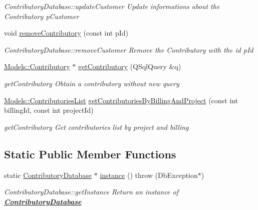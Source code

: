 \begin{DoxyCompactItemize}
\begin{DoxyCompactList}\small\item\em Contributory\-Database\-::update\-Customer Update informations about the Contributory {\itshape p\-Customer} \end{DoxyCompactList}\item 
void \hyperlink{classDatabases_1_1ContributoryDatabase_a3c99a1730bce8dbf3cab72896d8f17ff}{remove\-Contributory} (const int p\-Id)
\begin{DoxyCompactList}\small\item\em Contributory\-Database\-::remove\-Customer Remove the Contributory with the id {\itshape p\-Id} \end{DoxyCompactList}\item 
\hyperlink{classModels_1_1Contributory}{Models\-::\-Contributory} $\ast$ \hyperlink{classDatabases_1_1ContributoryDatabase_a6fc0f3eca03c49d919e7dbd2f8290555}{get\-Contributory} (Q\-Sql\-Query \&q)
\begin{DoxyCompactList}\small\item\em get\-Contributory Obtain a contributory without new query \end{DoxyCompactList}\item 
\hyperlink{classModels_1_1ContributoriesList}{Models\-::\-Contributories\-List} \hyperlink{classDatabases_1_1ContributoryDatabase_ab1da3fd9479fc39d05da9d52ffc9bea2}{get\-Contributories\-By\-Billing\-And\-Project} (const int billing\-Id, const int project\-Id)
\begin{DoxyCompactList}\small\item\em get\-Contributory Get contributories list by project and billing \end{DoxyCompactList}\end{DoxyCompactItemize}
\subsection*{Static Public Member Functions}
\begin{DoxyCompactItemize}
\item 
static \hyperlink{classDatabases_1_1ContributoryDatabase}{Contributory\-Database} $\ast$ \hyperlink{classDatabases_1_1ContributoryDatabase_ae0f4e8192dec79685b26e187d3871c4d}{instance} ()  throw (\-Db\-Exception$\ast$)
\begin{DoxyCompactList}\small\item\em Contributory\-Database\-::get\-Instance Return an instance of {\bfseries \hyperlink{classDatabases_1_1ContributoryDatabase}{Contributory\-Database}} \end{DoxyCompactList}\end{DoxyCompactItemize}

